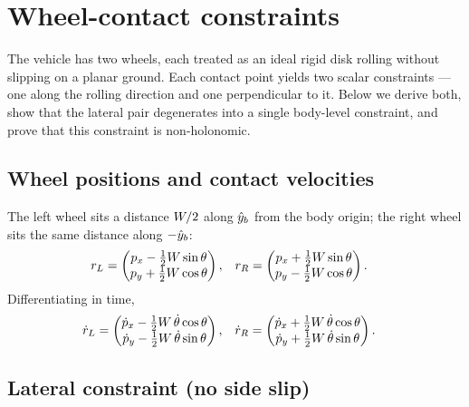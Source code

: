 \section{Wheel-contact constraints}
\label{sec:constraints}

The vehicle has two wheels, each treated as an ideal rigid disk rolling
without slipping on a planar ground. Each contact point yields two scalar
constraints --- one along the rolling direction and one perpendicular to it.
Below we derive both, show that the lateral pair degenerates into a single
body-level constraint, and prove that this constraint is non-holonomic.

\subsection{Wheel positions and contact velocities}

The left wheel sits a distance $W/2$ along $\hat{y}_{b}$ from the body
origin; the right wheel sits the same distance along $-\hat{y}_{b}$:
\begin{align}
    r_L &= \begin{pmatrix} p_x - \tfrac{1}{2}W\sin\theta \\
                           p_y + \tfrac{1}{2}W\cos\theta \end{pmatrix},
    &
    r_R &= \begin{pmatrix} p_x + \tfrac{1}{2}W\sin\theta \\
                           p_y - \tfrac{1}{2}W\cos\theta \end{pmatrix}.
    \label{eq:wheel-positions}
\end{align}
Differentiating in time,
\begin{align}
    \dot r_L &= \begin{pmatrix}
        \dot p_x - \tfrac{1}{2}W\,\dot\theta\cos\theta \\
        \dot p_y - \tfrac{1}{2}W\,\dot\theta\sin\theta
    \end{pmatrix},
    &
    \dot r_R &= \begin{pmatrix}
        \dot p_x + \tfrac{1}{2}W\,\dot\theta\cos\theta \\
        \dot p_y + \tfrac{1}{2}W\,\dot\theta\sin\theta
    \end{pmatrix}.
\end{align}

\subsection{Lateral constraint (no side slip)}

